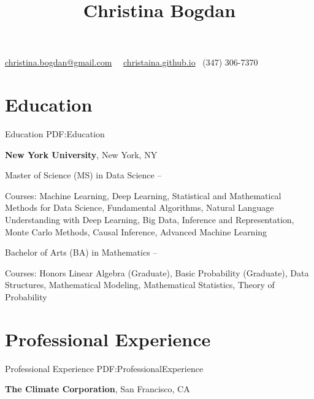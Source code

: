 \documentclass[letterpaper,9.5pt,oneside]{article}
\newcommand{\CVAuthor}{Christina Bogdan}
\begin{document}

\title{\CVAuthor}

\begin{subtitle}

\par
\href{mailto:christina.bogdan@gmail.com}
{christina.bogdan@gmail.com}
\, \SubBulletSymbol \, \url{christaina.github.io}
\SubBulletSymbol \, (347) 306-7370
\end{subtitle}

\begin{body}


\section
{Education}
{Education}
{PDF:Education}


\textbf{New York University},
New York, NY

\GapNoBreak
Master of Science (MS) in
Data Science
\hfill
{} --
\begin{detail}
\BulletItem
Courses: Machine Learning, Deep Learning, Statistical and Mathematical Methods for Data Science, Fundamental Algorithms, Natural Language Understanding with Deep Learning, Big Data, Inference and Representation, Monte Carlo Methods, Causal Inference, Advanced Machine Learning
\end{detail}

\GapNoBreak
Bachelor of Arts (BA) in Mathematics
\hfill
{} --
\begin{detail}
\BulletItem
Courses: Honors Linear Algebra (Graduate), Basic Probability (Graduate), Data Structures, Mathematical Modeling, Mathematical Statistics, Theory of Probability
\end{detail}



\section
{Professional Experience}
{Professional Experience}
{PDF:ProfessionalExperience}


\textbf{The Climate Corporation},
San Francisco, CA


\end{body}
\end{document}
